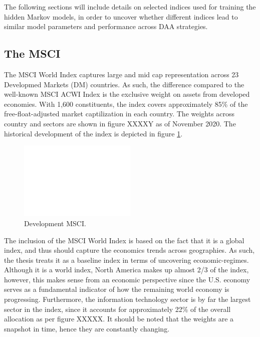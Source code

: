 The following sections will include details on selected indices used for training the hidden Markov models, in order to uncover whether different indices lead to similar model parameters and performance across DAA strategies. 

\subsection{The MSCI}
\label{subsection: MSCI Index}
The MSCI World Index captures large and mid cap representation across 23 Developmed Markets (DM) countries. As such, the difference compared to the well-known MSCI ACWI Index is the exclusive weight on assets from developed economies. With 1,600 constituents, the index covers approximately 85\% of the free-float-adjusted market captilization in each country. The weights across country and sectors are shown in figure XXXXY as of November 2020. The historical development of the index is depicted in figure \ref{fig:MSCI_index}. 
 
\begin{figure}[H] 
    \centering
    \includegraphics[width=0.5\textwidth]{analysis/data_description/MSCI_index.png}
    \caption{Development MSCI.}
    \label{fig:MSCI_index}
\end{figure}


The inclusion of the MSCI World Index is based on the fact that it is a global index, and thus should capture the economics trends across geographies. As such, the thesis treats it as a baseline index in terms of uncovering economic-regimes. Although it is a world index, North America makes up almost 2/3 of the index, however, this makes sense from an economic perspective since the U.S. economy serves as a fundamental indicator of how the remaining world economy is progressing. Furthermore, the information technology sector is by far the largest sector in the index, since it accounts for approximately 22\% of the overall allocation as per figure XXXXX. It should be noted that the weights are a snapshot in time, hence they are constantly changing. 

